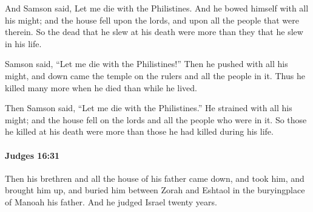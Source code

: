 			\begin{versebox}
					\item[BHS] 
					\item[ASV] And Samson said, Let me die with the Philistines. And he bowed himself with all his might; and the house fell upon the lords, and upon all the people that were therein. So the dead that he slew at his death were more than they that he slew in his life.
					\item[NIV] Samson said, “Let me die with the Philistines!” Then he pushed with all his might, and down came the temple on the rulers and all the people in it. Thus he killed many more when he died than while he lived.
					\item[NRSV] Then Samson said, “Let me die with the Philistines.” He strained with all his might; and the house fell on the lords and all the people who were in it. So those he killed at his death were more than those he had killed during his life.
			\end{versebox}

		\paragraph{Judges 16:31} %
			\label{JUDGES-16-31}

			Then his brethren and all the house of his father came down, and took him, and brought him up, and buried him between Zorah and Eshtaol in the buryingplace of Manoah his father. And he judged Israel twenty years.

